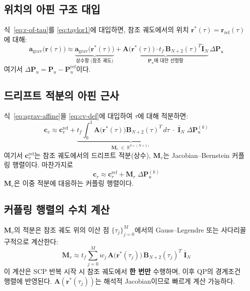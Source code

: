 \documentclass[11pt]{article}
\begin{document}
\subsection{위치의 아핀 구조 대입}

식~\eqref{eq:r-of-tau}를 \eqref{eq:taylor1}에 대입하면,
참조 궤도에서의 위치 $\mathbf{r}^*(\tau) = \mathbf{r}_\text{ref}(\tau)$에 대해:
\begin{equation}
  \mathbf{a}_\text{grav}\bigl(\mathbf{r}(\tau)\bigr) \approx
    \underbrace{\mathbf{a}_\text{grav}\bigl(\mathbf{r}^*(\tau)\bigr)}_{\text{상수항 (참조 궤도)}}
    + \underbrace{\mathbf{A}\bigl(\mathbf{r}^*(\tau)\bigr) \cdot
      t_f \, \mathbf{B}_{N+2}(\tau)^T \bar{\mathbf{I}}_N}_{\text{$\mathbf{P}_u$에 대한 선형항}}
    \,\Delta \mathbf{P}_u
  \label{eq:agrav-affine}
\end{equation}
여기서 $\Delta\mathbf{P}_u = \mathbf{P}_u - \mathbf{P}_u^\text{ref}$이다.

\subsection{드리프트 적분의 아핀 근사}

식~\eqref{eq:agrav-affine}을 \eqref{eq:cv-def}에 대입하여 $\tau$에 대해 적분하면:
\begin{equation}
  \boxed{
  \mathbf{c}_v \approx \mathbf{c}_v^\text{ref}
    + \underbrace{t_f \int_0^1 \mathbf{A}\bigl(\mathbf{r}^*(\tau)\bigr)
      \mathbf{B}_{N+2}(\tau)^T \,d\tau \;\cdot\; \bar{\mathbf{I}}_N}_{\displaystyle \mathbf{M}_v \;\in\; \mathbb{R}^{3 \times (N+1)}}
    \;\Delta\mathbf{P}_u^{(k)}
  }
  \label{eq:cv-affine}
\end{equation}
여기서 $\mathbf{c}_v^\text{ref}$는 참조 궤도에서의 드리프트 적분(상수),
$\mathbf{M}_v$는 Jacobian--Bernstein 커플링 행렬이다.
마찬가지로
\begin{equation}
  \boxed{
  \mathbf{c}_r \approx \mathbf{c}_r^\text{ref}
    + \mathbf{M}_r \;\Delta\mathbf{P}_u^{(k)}
  }
  \label{eq:cr-affine}
\end{equation}
$\mathbf{M}_r$은 이중 적분에 대응하는 커플링 행렬이다.

\subsection{커플링 행렬의 수치 계산}

$\mathbf{M}_v$의 적분은 참조 궤도 위의 이산 점 $\{\tau_j\}_{j=0}^M$에서의
Gauss--Legendre 또는 사다리꼴 구적으로 계산한다:
\begin{equation}
  \mathbf{M}_v \approx t_f \sum_{j=0}^M w_j \,
    \mathbf{A}\bigl(\mathbf{r}^*(\tau_j)\bigr) \,
    \mathbf{B}_{N+2}(\tau_j)^T \;\bar{\mathbf{I}}_N
  \label{eq:Mv-quad}
\end{equation}
이 계산은 SCP 반복 시작 시 참조 궤도에서 \textbf{한 번만} 수행하며,
이후 QP의 경계조건 행렬에 반영된다.
$\mathbf{A}(\mathbf{r}^*(\tau_j))$는 해석적 Jacobian이므로 빠르게 계산 가능하다.
\end{document}
